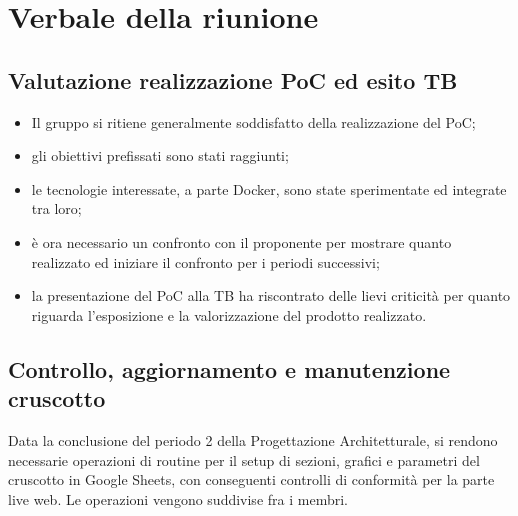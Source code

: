 \section{Verbale della riunione}

\subsection{Valutazione realizzazione PoC ed esito TB}
\begin{itemize}
    \item Il gruppo si ritiene generalmente soddisfatto della realizzazione del PoC;
    \item gli obiettivi prefissati sono stati raggiunti;
    \item le tecnologie interessate, a parte Docker, sono state sperimentate ed integrate tra loro;
    \item è ora necessario un confronto con il proponente per mostrare quanto realizzato ed iniziare il confronto per i periodi successivi;
    \item la presentazione del PoC alla TB ha riscontrato delle lievi criticità per quanto riguarda l'esposizione e la valorizzazione del prodotto realizzato.
\end{itemize}

\subsection{Controllo, aggiornamento e manutenzione cruscotto}
Data la conclusione del periodo 2 della Progettazione Architetturale, si rendono necessarie operazioni di routine per il setup di sezioni, grafici e parametri del cruscotto in Google Sheets, con conseguenti controlli di conformità per la parte live web. Le operazioni vengono suddivise fra i membri.

